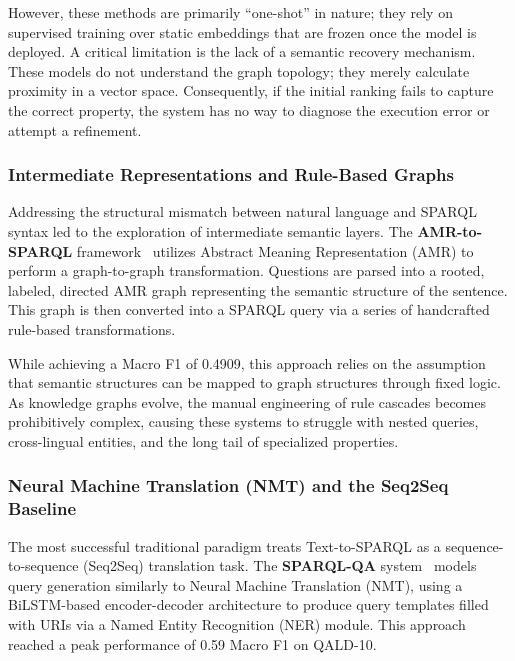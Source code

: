 However, these methods are primarily ``one-shot'' in nature; they rely on supervised training over static embeddings that are frozen once the model is deployed. A critical limitation is the lack of a semantic recovery mechanism. These models do not understand the graph topology; they merely calculate proximity in a vector space. Consequently, if the initial ranking fails to capture the correct property, the system has no way to diagnose the execution error or attempt a refinement. 

\subsubsection{Intermediate Representations and Rule-Based Graphs}
Addressing the structural mismatch between natural language and SPARQL syntax led to the exploration of intermediate semantic layers. The \textbf{AMR-to-SPARQL} framework~\cite{shivashankar2022amr} utilizes Abstract Meaning Representation (AMR) to perform a graph-to-graph transformation. Questions are parsed into a rooted, labeled, directed AMR graph representing the semantic structure of the sentence. This graph is then converted into a SPARQL query via a series of handcrafted rule-based transformations.

While achieving a Macro F1 of 0.4909, this approach relies on the assumption that semantic structures can be mapped to graph structures through fixed logic. As knowledge graphs evolve, the manual engineering of rule cascades becomes prohibitively complex, causing these systems to struggle with nested queries, cross-lingual entities, and the long tail of specialized properties.

\subsubsection{Neural Machine Translation (NMT) and the Seq2Seq Baseline}
The most successful traditional paradigm treats Text-to-SPARQL as a sequence-to-sequence (Seq2Seq) translation task. The \textbf{SPARQL-QA} system~\cite{santana2022sparqlqa} models query generation similarly to Neural Machine Translation (NMT), using a BiLSTM-based encoder-decoder architecture to produce query templates filled with URIs via a Named Entity Recognition (NER) module. This approach reached a peak performance of 0.59 Macro F1 on QALD-10.

